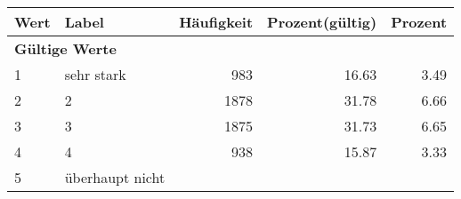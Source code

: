      \begin{longtable}{lXrrr}
     \toprule
     \textbf{Wert} & \textbf{Label} & \textbf{Häufigkeit} & \textbf{Prozent(gültig)} & \textbf{Prozent} \\
     \endhead
     \midrule
     \multicolumn{5}{l}{\textbf{Gültige Werte}}\\

     1 &
     \multicolumn{1}{X}{ sehr stark   } &


       \num{983} &
       \num[round-mode=places,round-precision=2]{16,63} &
         \num[round-mode=places,round-precision=2]{3,49} \\

     2 &
     \multicolumn{1}{X}{ 2   } &


       \num{1878} &
       \num[round-mode=places,round-precision=2]{31,78} &
         \num[round-mode=places,round-precision=2]{6,66} \\

     3 &
     \multicolumn{1}{X}{ 3   } &


       \num{1875} &
       \num[round-mode=places,round-precision=2]{31,73} &
         \num[round-mode=places,round-precision=2]{6,65} \\

     4 &
     \multicolumn{1}{X}{ 4   } &


       \num{938} &
       \num[round-mode=places,round-precision=2]{15,87} &
         \num[round-mode=places,round-precision=2]{3,33} \\

     5 &
     \multicolumn{1}{X}{ überhaupt nicht   } &



\end{longtable}

